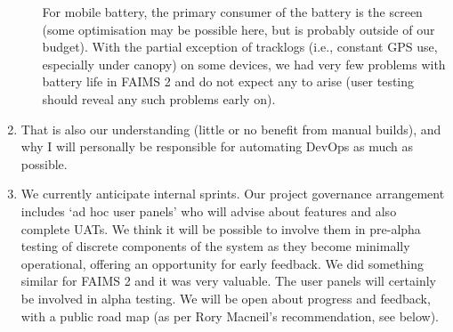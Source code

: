 \documentclass[a4paper,headings=small fontsize=10pt]{scrreprt}
\begin{document}
\begin{enumerate}
\begin{enumerate}
    For mobile battery, the primary consumer of the battery 
    is the screen (some optimisation may be possible here, but is probably outside
    of our budget). With the partial exception of tracklogs (i.e., constant GPS use, 
    especially under canopy) on some devices, we had very few problems with battery 
    life in FAIMS 2 and do not expect any to arise (user testing should reveal any such
    problems early on). 
   
  \end{enumerate}
\item That is also our understanding (little or no benefit from manual builds), 
   and why I will personally be responsible for automating DevOps as much as possible.
 
\item We currently anticipate internal sprints. Our project governance arrangement
   includes `ad hoc user panels' who will advise about features and also complete UATs.
   We think it will be possible to involve them in pre-alpha testing of discrete 
   components of the system as they become minimally operational, offering an
   opportunity for early feedback. We did something similar for FAIMS 2 and it was
   very valuable. The user panels will certainly be involved in alpha testing.
   We will be open about progress and feedback, with a public road map (as per Rory 
   Macneil's recommendation, see below). 
 

\end{enumerate}
\end{document}

